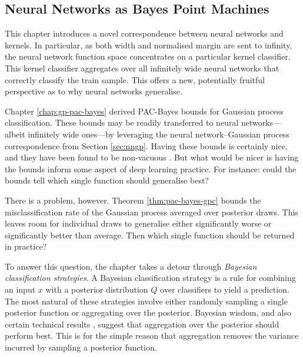 \begin{refsection}

\chapter{Neural Networks as Bayes Point Machines}\label{chap:bpm}

\begin{tcolorbox}
This chapter introduces a novel correspondence between neural networks and kernels. In particular, as both width and normalised margin are sent to infinity, the neural network function space concentrates on a particular kernel classifier. This kernel classifier aggregates over all infinitely wide neural networks that correctly classify the train sample. This offers a new, potentially fruitful perspective as to why neural networks generalise.
\end{tcolorbox}

Chapter \ref{chap:gp-pac-bayes} derived PAC-Bayes bounds for Gaussian process classification. These bounds may be readily transferred to neural networks---albeit infinitely wide ones---by leveraging the neural network--Gaussian process correspondence from Section \ref{sec:nngp}. Having these bounds is certainly nice, and they have been found to be non-vacuous \citep{seeger,Prez2020GeneralizationBF}. But what would be nicer is having the bounds inform some aspect of deep learning practice. For instance: could the bounds tell which single function should generalise best?

There is a problem, however. Theorem \ref{thm:pac-bayes-gpc} bounds the misclassification rate of the Gaussian process averaged over posterior draws. This leaves room for individual draws to generalise either significantly worse or significantly better than average. Then which single function should be returned in practice? 

To answer this question, the chapter takes a detour through \textit{Bayesian classification strategies}. A Bayesian classification strategy is a rule for combining an input $x$ with a posterior distribution $Q$ over classifiers to yield a prediction. The most natural of these strategies involve either randomly sampling a single posterior function or aggregating over the posterior. Bayesian wisdom, and also certain technical results \citep{lacasse}, suggest that aggregation over the posterior should perform best. This is for the simple reason that aggregation removes the variance incurred by sampling a posterior function. 


\end{refsection}
